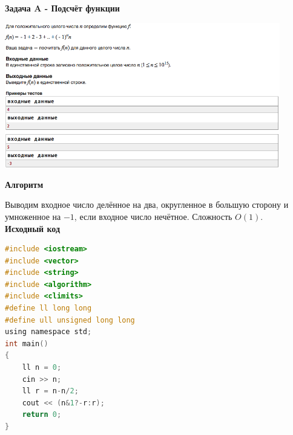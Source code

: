 \documentclass[a4paper,12pt]{article}
\begin{document}
\newpage
\textbf{{\large Задача A - Подсчёт функции}} \\
\begin{center}
\includegraphics[width=0.9\textwidth]{C_277/C_277_A.png}\\ [1cm]
\end{center}

\textbf{{\large Алгоритм}}

Выводим входное число делённое на два, округленное в большую сторону и умноженное на $-1$, если входное число нечётное. Сложность $O(1)$. \\

\textbf{{\large Исходный код}} \\
\begin{lstlisting}[language=C]
#include <iostream>
#include <vector>
#include <string>
#include <algorithm>
#include <climits>
#define ll long long
#define ull unsigned long long
using namespace std;
int main()
{
    ll n = 0;
    cin >> n;
    ll r = n-n/2;
    cout << (n&1?-r:r);
    return 0;
}
\end{lstlisting}
\end{document}
